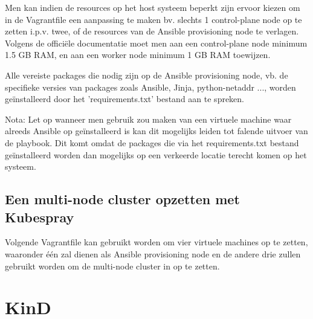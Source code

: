 Men kan indien de resources op het host systeem beperkt zijn ervoor kiezen om in de Vagrantfile een aanpassing te maken bv. slechts 1 control-plane node op te zetten i.p.v. twee, of de resources van de Ansible provisioning node te verlagen. Volgens de officiële documentatie moet men aan een control-plane node minimum 1.5 GB RAM, en aan een worker node minimum 1 GB RAM toewijzen.

Alle vereiste packages die nodig zijn op de Ansible provisioning node, vb. de specifieke versies van packages zoals Ansible, Jinja, python-netaddr ..., worden geïnstalleerd door het 'requirements.txt' bestand aan te spreken. \autocite{Kubespray2022} 

Nota: Let op wanneer men gebruik zou maken van een virtuele machine waar alreeds Ansible op geïnstalleerd is kan dit mogelijks leiden tot falende uitvoer van de playbook. Dit komt omdat de packages die via het requirements.txt bestand geïnstalleerd worden dan mogelijks op een verkeerde locatie terecht komen op het systeem. \autocite{Kubespray2022a}

\subsection{Een multi-node cluster opzetten met Kubespray}

Volgende Vagrantfile kan gebruikt worden om vier virtuele machines op te zetten, waaronder één zal dienen als Ansible provisioning node en de andere drie zullen gebruikt worden om de multi-node cluster in op te zetten. 

\section{KinD}

